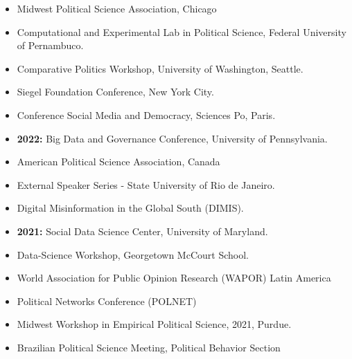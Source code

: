 \documentclass[letterpaper, 11pt]{article}
\begin{document}
\begin{itemize}[leftmargin=0cm, noitemsep]
    \item \hspace{1.25cm} Midwest Political Science Association, Chicago
    \item \hspace{1.25cm} Computational and Experimental Lab in Political Science, Federal University of Pernambuco.
    \item \hspace{1.25cm} Comparative Politics Workshop, University of Washington, Seattle.
    \item \hspace{1.25cm}  Siegel Foundation Conference, New York City.
    \item \hspace{1.25cm}  Conference Social Media and Democracy, Sciences Po, Paris.

    \vspace{.2cm}

    \item \textbf{2022:} \hspace{.02cm} Big Data and Governance Conference, University of Pennsylvania.
    \item \hspace{1.25cm} American Political Science Association, Canada
    \item \hspace{1.25cm}  External Speaker Series - State University of Rio de Janeiro.
    \item \hspace{1.25cm}  Digital Misinformation in the Global South (DIMIS).

    \vspace{.2cm}

    \item \textbf{2021:} \hspace{.02cm} Social Data Science Center, University of Maryland.
    \item \hspace{1.25cm}  Data-Science Workshop, Georgetown McCourt School.
    \item \hspace{1.25cm}  World Association for Public Opinion Research (WAPOR) Latin America
    \item \hspace{1.25cm} Political Networks Conference (POLNET)
    \item \hspace{1.25cm} Midwest Workshop in Empirical Political Science, 2021, Purdue.
   \item \hspace{1.25cm} Brazilian Political Science Meeting, Political Behavior Section
\end{itemize}
\end{document}
